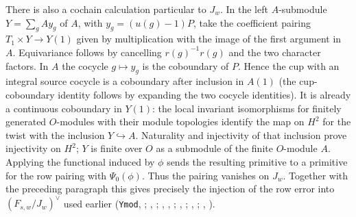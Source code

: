 There is also a cochain calculation particular to $J_w$.
In the left $A$-submodule $Y=\sum_g A y_g$ of $A$, with $y_g=(u(g)-1)P$, take the coefficient
pairing $T_1\times Y\to Y(1)$ given by multiplication with the
image of the first argument in $A$. Equivariance follows by cancelling
$r(g)^{-1}r(g)$ and the two character factors. In $A$ the cocycle
$g\mapsto y_g$ is the coboundary of $P$. Hence the cup with an
integral source cocycle is a coboundary after inclusion in $A(1)$
(the cup-coboundary identity follows by expanding the two cocycle
identities). It is already a continuous coboundary in $Y(1)$:
the local invariant isomorphisms for finitely generated $O$-modules with
their module topologies identify the map on $H^2$ for the twist with
the inclusion $Y\hookrightarrow A$. Naturality and injectivity of
that inclusion prove injectivity on $H^2$; $Y$ is finite over $O$ as
a submodule of the finite $O$-module $A$. Applying the functional
induced by $\phi$ sends the resulting primitive to a primitive for the
row pairing with $\Psi_0(\phi)$. Thus the pairing vanishes on $J_w$.
Together with the preceding paragraph this gives precisely the
injection of the row error into $(F_{s,w}/J_w)^\vee$ used earlier
(\nolinkurl{Ymod}, ; , ;
, ,
;
, ;
, ;
, ).

